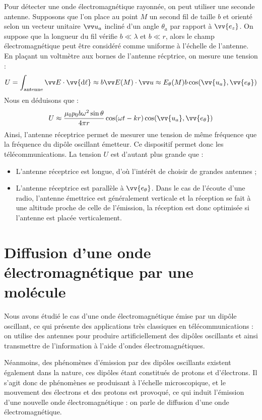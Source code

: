 \documentclass[11pt,fleqn]{book} %
\newcommand{\dd}{\mathrm{d}}
\begin{document}
Pour détecter une onde électromagnétique rayonnée, on peut utiliser une seconde antenne. Supposons que l'on place au point $M$ un second fil de taille $b$ et orienté selon un vecteur unitaire $\vv u_a$ incliné d'un angle $\theta_a$ par rapport à $\vv{e_z}$. On suppose que la longueur du fil vérifie $b \ll \lambda$ et $b \ll r$, alors le champ électromagnétique peut être considéré comme uniforme à l'échelle de l'antenne. En plaçant un voltmètre aux bornes de l'antenne récptrice, on mesure une tension :
\begin{equation}
	U = \int_{\rm antenne} \vv E \cdot \vv{\dd \ell} \approx b \vv E(M) \cdot \vv u \approx E_\theta(M) b \cos(\vv{u_a}, \vv{e_\theta})
\end{equation}
Nous en déduisons que :
\begin{equation}
	U \approx \dfrac{\mu_0 p_0 b \omega^2 \sin \theta}{4 \pi r} \cos(\omega t - k r) \cos(\vv{u_a},\vv{e_\theta})
\end{equation}
Ainsi, l'antenne réceptrice permet de mesurer une tension de même fréquence que la fréquence du dipôle oscillant émetteur. Ce dispositif permet donc les télécommunications. La tension $U$ est d'autant plus grande que :
\begin{itemize}
	\item L'antenne réceptrice est longue, d'où l'intérêt de choisir de grandes antennes ;
	\item L'antenne réceptrice est parallèle à $\vv{e_\theta}$. Dans le cas de l'écoute d'une radio, l'antenne émettrice est généralement verticale et la réception se fait à une altitude proche de celle de l'émission, la réception est donc optimisée si l'antenne est placée verticalement.
\end{itemize}

\section{Diffusion d'une onde électromagnétique par une molécule}

Nous avons étudié le cas d'une onde électromagnétique émise par un dipôle oscillant, ce qui présente des applications très classiques en télécommunications : on utilise des antennes pour produire artificiellement des dipôles oscillants et ainsi transmettre de l'information à l'aide d'ondes électromagnétiques.

Néanmoins, des phénomènes d'émission par des dipôles oscillants existent également dans la nature, ces dipôles étant constitués de protons et d'électrons. Il s'agit donc de phénomènes se produisant à l'échelle microscopique, et le mouvement des électrons et des protons est provoqué, ce qui induit l'émission d'une nouvelle onde électromagnétique : on parle de diffusion d'une onde électromagnétique.
\end{document}
